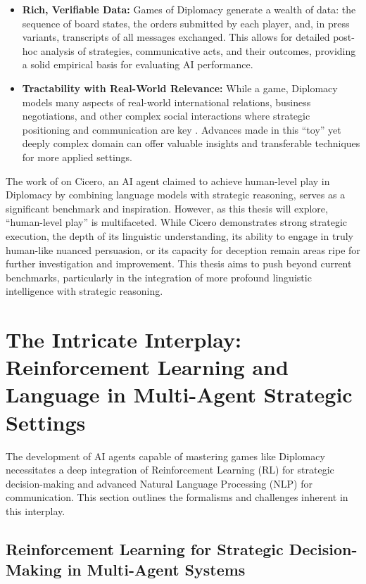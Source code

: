 \documentclass[oneside]{memoir}
\begin{document}
\begin{itemize}
    \item \textbf{Rich, Verifiable Data:} Games of Diplomacy generate a wealth of data: the sequence of board states, the orders submitted by each player, and, in press variants, transcripts of all messages exchanged. This allows for detailed post-hoc analysis of strategies, communicative acts, and their outcomes, providing a solid empirical basis for evaluating AI performance.
    \item \textbf{Tractability with Real-World Relevance:} While a game, Diplomacy models many aspects of real-world international relations, business negotiations, and other complex social interactions where strategic positioning and communication are key \citep{NEURIPS2019_84b20b1f}. Advances made in this ``toy'' yet deeply complex domain can offer valuable insights and transferable techniques for more applied settings.
\end{itemize}
The work of \cite{meta2022human} on Cicero, an AI agent claimed to achieve human-level play in Diplomacy by combining language models with strategic reasoning, serves as a significant benchmark and inspiration. However, as this thesis will explore, ``human-level play'' is multifaceted. While Cicero demonstrates strong strategic execution, the depth of its linguistic understanding, its ability to engage in truly human-like nuanced persuasion, or its capacity for deception remain areas ripe for further investigation and improvement. This thesis aims to push beyond current benchmarks, particularly in the integration of more profound linguistic intelligence with strategic reasoning.

\section{The Intricate Interplay: Reinforcement Learning and Language in Multi-Agent Strategic Settings}

The development of AI agents capable of mastering games like Diplomacy necessitates a deep integration of Reinforcement Learning (RL) for strategic decision-making and advanced Natural Language Processing (NLP) for communication. This section outlines the formalisms and challenges inherent in this interplay.

\subsection{Reinforcement Learning for Strategic Decision-Making in Multi-Agent Systems}
\end{document}
